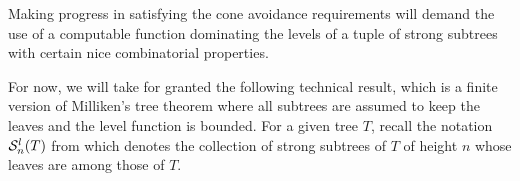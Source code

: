 
Making progress in satisfying the cone avoidance requirements will demand the use of a computable function dominating the levels of a tuple of strong subtrees with certain nice combinatorial properties. %


For now, we will take for granted the following technical result, which is a finite version of Milliken's tree theorem where all subtrees are assumed to keep the leaves and the level function is bounded. For a given tree $T$, recall the notation $\mathcal{S}^{l}_{n}({T})$ from  which denotes the collection of strong subtrees of $T$ of height $n$ whose leaves are among those of $T$.

